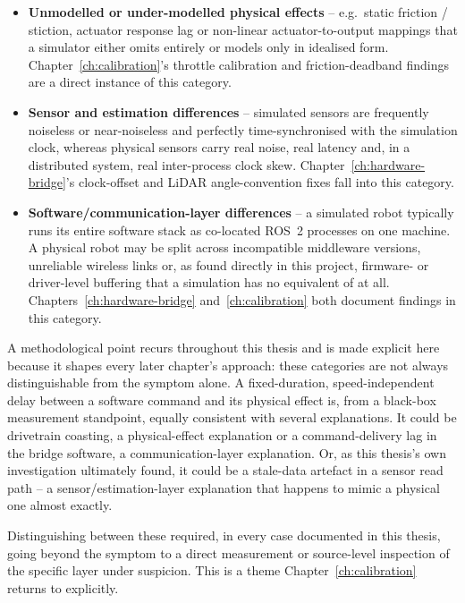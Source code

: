 \begin{itemize}
  \item \textbf{Unmodelled or under-modelled physical effects} --
    e.g.\ static friction / stiction, actuator response lag or
    non-linear actuator-to-output mappings that a simulator either
    omits entirely or models only in idealised form. Chapter~\ref{ch:calibration}'s
    throttle calibration and friction-deadband findings are a direct
    instance of this category.
  \item \textbf{Sensor and estimation differences} -- simulated
    sensors are frequently noiseless or near-noiseless and
    perfectly time-synchronised with the simulation clock, whereas
    physical sensors carry real noise, real latency and, in a
    distributed system, real inter-process clock skew.
    Chapter~\ref{ch:hardware-bridge}'s clock-offset and LiDAR
    angle-convention fixes fall into this category.
  \item \textbf{Software/communication-layer differences} -- a
    simulated robot typically runs its entire software stack as
    co-located ROS~2 processes on one machine. A physical robot may
    be split across incompatible middleware versions, unreliable
    wireless links or, as found directly in this project, firmware-
   or driver-level buffering that a simulation has no equivalent of
    at all. Chapters~\ref{ch:hardware-bridge}
    and~\ref{ch:calibration} both document findings in this
    category.
\end{itemize}

A methodological point recurs throughout this thesis and is made
explicit here because it shapes every later chapter's approach:
these categories are not always distinguishable from the symptom
alone. A fixed-duration, speed-independent delay between a software
command and its physical effect is, from a black-box measurement
standpoint, equally consistent with several explanations. It could
be drivetrain coasting, a physical-effect explanation or a
command-delivery lag in the bridge software, a communication-layer
explanation. Or, as this thesis's own investigation ultimately
found, it could be a stale-data artefact in a sensor read path -- a
sensor/estimation-layer explanation that happens to mimic a physical
one almost exactly.

Distinguishing between these required, in every case documented in
this thesis, going beyond the symptom to a direct measurement or
source-level inspection of the specific layer under suspicion. This
is a theme Chapter~\ref{ch:calibration} returns to explicitly.
